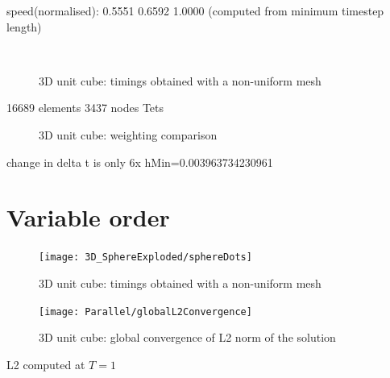 speed(normalised): 0.5551    0.6592    1.0000
(computed from minimum timestep length)
\begin{figure}[!ht]
	\centering
   \\
	\caption{3D unit cube: timings obtained with a non-uniform mesh}
	\label{fig:unitCubeNonUniformTimings}
\end{figure}

16689 elements
3437 nodes
Tets
\begin{figure}[!ht]
	\centering
{}
\caption{3D unit cube: weighting comparison}
	\label{fig:unitCubeNonUniformTimings}
\end{figure}
change in delta t is only 6x
hMin=0.003963734230961


\section{Variable order}
\begin{figure}[!ht]
	\centering
  \texttt{[image: 3D\_SphereExploded/sphereDots]}
	\caption{3D unit cube: timings obtained with a non-uniform mesh}
	\label{fig:unitCubeNonUniformAdaptiveP}
\end{figure}
\begin{figure}[!ht]
	\centering
\texttt{[image: Parallel/globalL2Convergence]}
\caption{3D unit cube: global convergence of L2 norm of the solution}
	\label{fig:unitCubeNonUniformGlobalAdaptivePL2Conv}
\end{figure}
L2 computed at $T=1$
